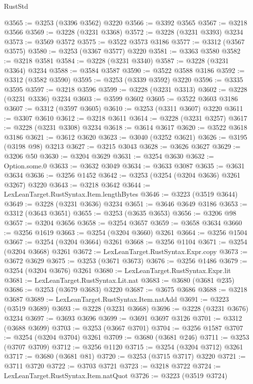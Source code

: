 \begin{lexlean}{RustStd}
\begin{coremodule}
@3565 := @3253 (@3396 @3562) @3220
@3566 := @3392 @3565
@3567 := @3218 @3566
@3569 := @3228 (@3231 @3368)
@3572 := @3228 (@3231 @3393) @3234
@3573 := @3569 @3572
@3575 := @3522 @3573 @3186
@3577 := @3312 (@3567 @3575)
@3580 := @3253 (@3367 @3577) @3220
@3581 := @3363 @3580
@3582 := @3218 @3581
@3584 := @3228 (@3231 @3340)
@3587 := @3228 (@3231 @3364) @3234
@3588 := @3584 @3587
@3590 := @3522 @3588 @3186
@3592 := @3312 (@3582 @3590)
@3595 := @3253 (@3339 @3592) @3220
@3596 := @3335 @3595
@3597 := @3218 @3596
@3599 := @3228 (@3231 @3313)
@3602 := @3228 (@3231 @3336) @3234
@3603 := @3599 @3602
@3605 := @3522 @3603 @3186
@3607 := @3312 (@3597 @3605)
@3610 := @3253 (@3311 @3607) @3220
@3611 := @3307 @3610
@3612 := @3218 @3611
@3614 := @3228 (@3231 @3257)
@3617 := @3228 (@3231 @3308) @3234
@3618 := @3614 @3617
@3620 := @3522 @3618 @3186
@3621 := @3612 @3620
@3623 := @3040 (@3252 @3621)
@3626 := @3195 (@3198 @98) @3213
@3627 := @3215 @3043
@3628 := @3626 @3627
@3629 := @3206 @50
@3630 := @3204 @3629
@3631 := @3254 @3630
@3632 := Option.some.{0}
@3633 := @3632 @3049
@3634 := @3633 @3087
@3635 := @3631 @3634
@3636 := @3256 @1452
@3642 := @3253 (@3254 (@3204 @3636) @3261 @3267) @3220
@3643 := @3218 @3642
@3644 := LexLeanTarget.RustSyntax.Item.lengthBytes
@3646 := @3223 (@3519 @3644)
@3649 := @3228 (@3231 @3636) @3234
@3651 := @3646 @3649 @3186
@3653 := @3312 (@3643 @3651)
@3655 := @3253 (@3635 @3653)
@3656 := @3206 @98
@3657 := @3204 @3656
@3658 := @3254 @3657
@3659 := @3658 @3634
@3660 := @3256 @1619
@3663 := @3254 (@3204 @3660) @3261
@3664 := @3256 @1504
@3667 := @3254 (@3204 @3664) @3261
@3668 := @3256 @1104
@3671 := @3254 (@3204 @3668) @3261
@3672 := LexLeanTarget.RustSyntax.Expr.copy
@3673 := @3672 @3629
@3675 := @3253 (@3671 @3673)
@3676 := @3256 @1486
@3679 := @3254 (@3204 @3676) @3261
@3680 := LexLeanTarget.RustSyntax.Expr.lit
@3681 := LexLeanTarget.RustSyntax.Lit.nat
@3683 := @3680 (@3681 @235)
@3686 := @3253 (@3679 @3683) @3220
@3687 := @3675 @3686
@3688 := @3218 @3687
@3689 := LexLeanTarget.RustSyntax.Item.natAdd
@3691 := @3223 (@3519 @3689)
@3693 := @3228 (@3231 @3668)
@3696 := @3228 (@3231 @3676) @3234
@3697 := @3693 @3696
@3699 := @3691 @3697 @3126
@3701 := @3312 (@3688 @3699)
@3703 := @3253 (@3667 @3701)
@3704 := @3256 @1587
@3707 := @3254 (@3204 @3704) @3261
@3709 := @3680 (@3681 @246)
@3711 := @3253 (@3707 @3709)
@3712 := @3256 @1120
@3715 := @3254 (@3204 @3712) @3261
@3717 := @3680 (@3681 @81)
@3720 := @3253 (@3715 @3717) @3220
@3721 := @3711 @3720
@3722 := @3703 @3721
@3723 := @3218 @3722
@3724 := LexLeanTarget.RustSyntax.Item.natQuot
@3726 := @3223 (@3519 @3724)

\end{coremodule}
\end{lexlean}
